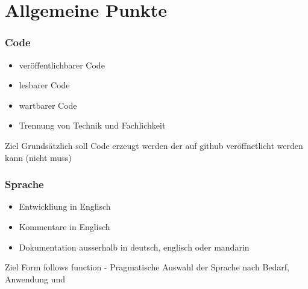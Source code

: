 \section{Allgemeine Punkte} 
\begin{frame}
\frametitle{Code} 
\begin{itemize}
\item veröffentlichbarer Code
\item lesbarer Code
\item wartbarer Code
  \item Trennung von Technik und Fachlichkeit
\end{itemize}
\begin{block}{Ziel}
  Grundsätzlich soll Code erzeugt werden der auf github veröffnetlicht werden kann (nicht muss)
  \end{block}
\end{frame}
\begin{frame}
\frametitle{Sprache} 
\begin{itemize}
\item Entwickliung in Englisch
\item Kommentare in Englisch
\item Dokumentation ausserhalb in deutsch, englisch oder mandarin
\end{itemize}
\begin{block}{Ziel}
  Form follows function - Pragmatische Auswahl der Sprache nach Bedarf, Anwendung und
  \end{block}
\end{frame}